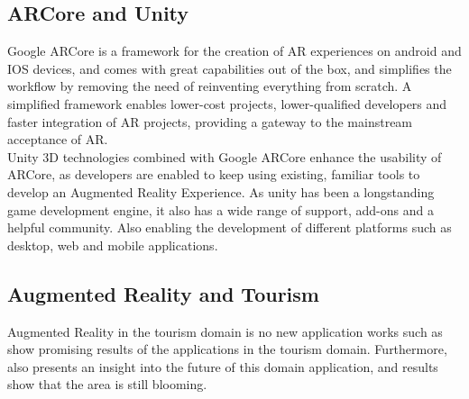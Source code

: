 
\subsection{ARCore and Unity}
Google ARCore is a framework for the creation of AR experiences on android and IOS devices, and comes with great capabilities out of the box, and simplifies the workflow 
by removing the need of reinventing everything from scratch. 
A simplified framework enables lower-cost projects\cite{Huang2019}, lower-qualified developers and faster integration of AR projects, 
providing a gateway to the mainstream acceptance of AR.\\
Unity 3D technologies combined with Google ARCore enhance the usability of ARCore, as developers are enabled to keep using existing, 
familiar tools to develop an Augmented Reality Experience. As unity has been a longstanding game development engine, it also has a wide range of support, 
add-ons and a helpful community. Also enabling the development of different platforms such as desktop, web and mobile applications\cite{Greene2018}.
\subsection{Augmented Reality and Tourism}
Augmented Reality in the tourism domain is no new application works such as \cite{OZKUL2019} show promising results of the applications in the tourism domain.
Furthermore, \cite{JingenLiang2021} also presents an insight into the future of this domain application, and results show that the area is still blooming.



